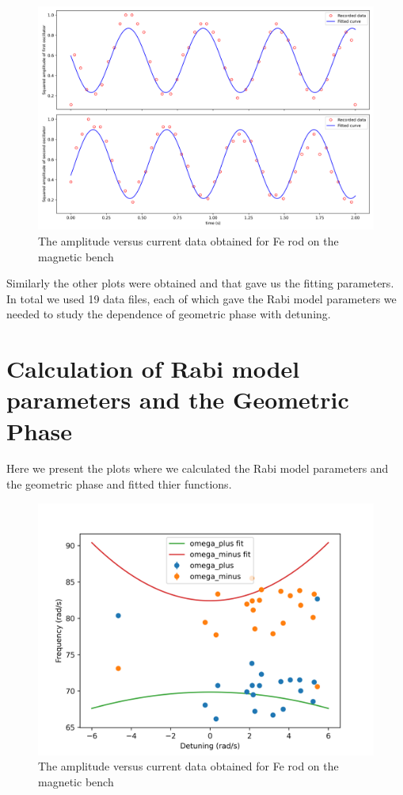 \begin{figure}[H]
	\centering
	\includegraphics[scale=0.4]{01_squared.png}
	\caption{The amplitude versus current data obtained for Fe rod on the magnetic bench}
	\label{fig:first_sq}
\end{figure}

Similarly the other plots were obtained and that gave us the fitting parameters. In total we used 19 data files, each of which gave the Rabi model parameters we needed to study the dependence of geometric phase with detuning. 

\section{Calculation of Rabi model parameters and the Geometric Phase}
Here we present the plots where we calculated the Rabi model parameters and the geometric phase and fitted thier functions.

\begin{figure}[H]
	\centering
	\includegraphics[scale=0.4]{20_freq_det.png}
	\caption{The amplitude versus current data obtained for Fe rod on the magnetic bench}
	\label{fig:first_sq}
\end{figure}

